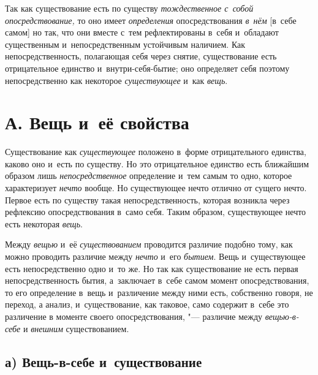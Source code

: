 Так как существование есть по существу
{\em тождественное с~собой опосредствование,} то оно
имеет {\em определения} опосредствования
{\em в~нём} [в~себе самом] но так, что они вместе с~тем
рефлектированы в~себя и~обладают существенным и~непосредственным устойчивым
наличием. Как непосредственность, полагающая себя через снятие,
существование есть отрицательное единство и~внутри-себя-бытие; оно
определяет себя поэтому непосредственно как некоторое
{\em существующее} и~как
{\em вещь}.


\section[А. Вещь и~её свойства]{А. Вещь и~её свойства}

Существование как {\em существующее} положено в~форме отрицательного
единства, каково оно и~есть по существу. Но это отрицательное единство есть
ближайшим образом лишь {\em непосредственное}
определение и~тем самым то одно, которое характеризует
{\em нечто} вообще. Но существующее нечто отлично от
сущего нечто. Первое есть по существу такая непосредственность, которая
возникла через рефлексию опосредствования в~само себя. Таким образом,
существующее нечто есть некоторая {\em вещь}.

Между {\em вещью} и~её
{\em существованием} проводится различие подобно тому,
как можно проводить различие между {\em нечто} и~его
{\em бытием}. Вещь и~существующее есть непосредственно
одно и~то же. Но так как существование не есть первая непосредственность
бытия, а~заключает в~себе самом момент опосредствования, то его определение
в~вещь и~различение между ними есть, собственно говоря, не переход, а
анализ, и~существование, как таковое, само содержит в~себе это различение в
моменте своего опосредствования, "--- различие между
{\em вещью-в-себе} и {\em внешним} существованием.


\subsection[а) Вещь-в-себе и~существование]{а) Вещь-в-себе и~существование}

